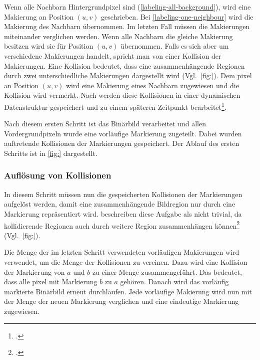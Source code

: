 Wenn alle Nachbarn Hintergrundpixel sind (\autoref{labeling-all-background}), wird eine Makierung an Position $(u,v)$
 geschrieben. Bei \autoref{labeling-one-neighbour} wird die Makierung des Nachbarn übernommen. Im letzten Fall müssen
 die Makierungen miteinander verglichen werden. Wenn alle Nachbarn die gleiche Makierung besitzen wird sie für Position
 $(u,v)$ übernommen. Falls es sich aber um verschiedene Makierungen handelt, spricht man von einer Kollision der
 Makierungen. Eine Kollision bedeutet, dass eine zusammenhängende Regionen durch zwei unterschiedliche Makierungen
 dargestellt wird (Vgl.~\autoref{fig:}). Dem \gls{pixel} an Position $(u,v)$ wird eine Makierung eines Nachbarn
 zugewiesen und die Kollision wird vermerkt. Nach \citeauthor{burger05} werden diese Kollisionen in einer dynamischen
 Datenstruktur gespeichert und zu einem späteren Zeitpunkt bearbeitet\footcite[Vgl.][S.~203--204]{burger05}.

Nach diesem ersten Schritt ist das Binärbild verarbeitet und allen Vordergrundpixeln wurde eine vorläufige Markierung
 zugeteilt. Dabei wurden auftretende Kollisionen der Markierungen gespeichert. Der Ablauf des ersten Schritts ist in
 \autoref{fig:} dargestellt.


\subsubsection{Auflösung von Kollisionen} %
\label{sec:auflösung_von_kollisionen}

In diesem Schritt müssen nun die gespeicherten Kollisionen der Markierungen aufgelöst werden, damit eine
 zusammenhängende Bildregion nur durch eine Markierung repräsentiert wird. \citeauthor{burger05} beschreiben diese
 Aufgabe  als nicht trivial, da kollidierende Regionen auch durch weitere Region zusammenhängen
 können\footcite[Vgl.][S.~205]{burger05} (Vgl.~\autoref{fig:}).

Die Menge der im letzten Schritt verwendeten vorläufigen Makierungen wird verwendet, um die Menge der Kollisionen
 zu vereinen. Dazu wird eine Kollision der Markierung von $a$ und $b$ zu einer Menge zusammengeführt. Das bedeutet,
 dass alle \gls{pixel} mit Markierung $b$ zu $a$ gehören. Danach wird das vorläufig markierte Binärbild erneut
 durchlaufen. Jede vorläufige Makierung wird nun mit der Menge der neuen Markierung verglichen und eine eindeutige
 Markierung zugewiesen.

